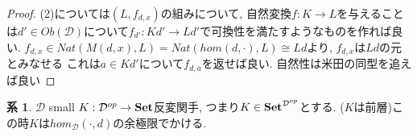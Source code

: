 \documentclass[dvipdfmx,a4paper,11pt]{report}
\theoremstyle{definition}
\newtheorem{cor}[thm]{系}
\begin{document}
\begin{proof}
(2)については$(L, f_{d,x})$の組みについて, 
自然変換$f : K \to L$を与えることは$d' \in Ob(\mathcal{D})$について$f_{d'} : Kd' \to Ld'$で可換性を満たすようなものを作れば良い. $f_{d,x} \in Nat( M(d,x), L)=Nat( hom(d,\cdot), L)\cong Ld$より, $f_{d,x}$は$Ld$の元とみなせる
これは$a \in Kd'$について$f_{d,a}$を返せば良い. 
自然性は米田の同型を追えば良い
\end{proof}

 \begin{tcolorbox}
 [colback = white, colframe = green!35!black, fonttitle = \bfseries,breakable = true]
\begin{cor}
\label{cor-colim-represent}
$\mathcal{D}$ small 
$K : \mathcal{D}^{op} \to {\bf Set}$反変関手, つまり$K \in {\bf Set}^{\mathcal{D}^{op}}$とする. ($K$は前層)この時$K$は$hom_{\mathcal{D}}(\cdot, d)$の余極限でかける. 
\end{cor}
\end{tcolorbox}
\end{document}
